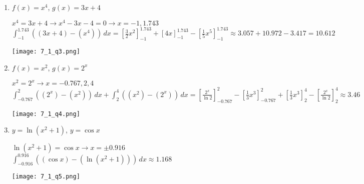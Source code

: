 \documentclass[10pt,letterpaper]{report}
\begin{document}
\begin{enumerate}
  \item{$f(x)=x^{4}$, $g(x)=3x+4$ \\}
  
    $x^{4}=3x+4\rightarrow x^{4}-3x-4=0\rightarrow x=-1, 1.743$ \\
    
    $\int_{-1}^{1.743}{\left(\left(3x+4\right)-\left(x^{4}\right)\right)}\,dx=
    [\frac{3}{2}x^{2}]_{-1}^{1.743}+[4x]_{-1}^{1.743}-[\frac{1}{5}x^{5}]_{-1}^{1.743}\approx
    3.057+10.972-3.417=10.612$ \\
    
    
    \begin{center}
      \texttt{[image: 7\_1\_q3.png]} \\
    \end{center}
    
    \pagebreak
    
  \item{$f(x)=x^{2}$, $g(x)=2^{x}$ \\}
  
    $x^{2}=2^{x}\rightarrow x=-0.767, 2, 4$ \\
    
    $\int_{-0.767}^{2}{\left(\left(2^{x}\right)-\left(x^{2}\right)\right)}\,dx+\int_{2}^{4}{\left(\left(x^{2}\right)-\left(2^{x}\right)\right)}\,dx=
    [\frac{2^{x}}{\ln{2}}]_{-0.767}^{2}-[\frac{1}{3}x^{3}]_{-0.767}^{2}+[\frac{1}{3}x^{3}]_{2}^{4}-[\frac{2^{x}}{\ln{2}}]_{2}^{4}\approx 3.46$ \\
    
    \begin{center}
      \texttt{[image: 7\_1\_q4.png]} \\
    \end{center}
    
    \pagebreak
    
  \item{$y=\ln{\left(x^{2}+1\right)}$, $y=\cos{x}$}
  
    $\ln{\left(x^{2}+1\right)}=\cos{x}\rightarrow x=\pm 0.916$ \\
    
    $\int_{-0.916}^{0.916}{\left(\left(\cos{x}\right)-\left(\ln{\left(x^{2}+1\right)}\right)\right)}\,dx\approx 1.168$ \\
    
    \begin{center}
      \texttt{[image: 7\_1\_q5.png]} \\
    \end{center}
    

\end{enumerate}
\end{document}
